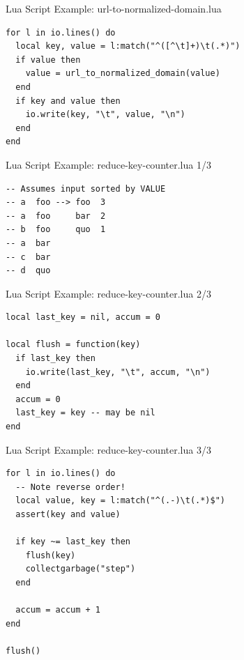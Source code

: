 \documentclass[handout]{beamer}
\begin{document}

\begin{frame}[fragile]{Lua Script Example: url-to-normalized-domain.lua}

\begin{verbatim}
for l in io.lines() do
  local key, value = l:match("^([^\t]+)\t(.*)")
  if value then
    value = url_to_normalized_domain(value)
  end
  if key and value then
    io.write(key, "\t", value, "\n")
  end
end
\end{verbatim}

\end{frame}


\begin{frame}[fragile]{Lua Script Example: reduce-key-counter.lua 1/3}

\begin{verbatim}
-- Assumes input sorted by VALUE
-- a  foo --> foo  3
-- a  foo     bar  2
-- b  foo     quo  1
-- a  bar
-- c  bar
-- d  quo
\end{verbatim}

\end{frame}


\begin{frame}[fragile]{Lua Script Example: reduce-key-counter.lua 2/3}

\begin{verbatim}
local last_key = nil, accum = 0

local flush = function(key)
  if last_key then
    io.write(last_key, "\t", accum, "\n")
  end
  accum = 0
  last_key = key -- may be nil
end
\end{verbatim}

\end{frame}


\begin{frame}[fragile]{Lua Script Example: reduce-key-counter.lua 3/3}

\begin{verbatim}
for l in io.lines() do
  -- Note reverse order!
  local value, key = l:match("^(.-)\t(.*)$")
  assert(key and value)

  if key ~= last_key then
    flush(key)
    collectgarbage("step")
  end

  accum = accum + 1
end

flush()
\end{verbatim}

\end{frame}
\end{document}

